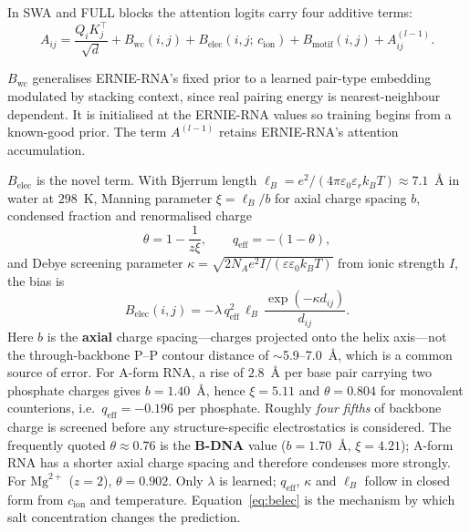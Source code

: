 \documentclass[11pt,a4paper]{article}
\begin{document}
In SWA and FULL blocks the attention logits carry four additive terms:
\begin{equation}
A_{ij} = \frac{Q_i K_j^{\top}}{\sqrt{d}}
       + B_{\mathrm{wc}}(i,j)
       + B_{\mathrm{elec}}(i,j;\,c_{\text{ion}})
       + B_{\mathrm{motif}}(i,j)
       + A^{(l-1)}_{ij}.
\end{equation}

$B_{\mathrm{wc}}$ generalises ERNIE-RNA's fixed prior to a learned pair-type
embedding modulated by stacking context, since real pairing energy is
nearest-neighbour dependent. It is initialised at the ERNIE-RNA values so
training begins from a known-good prior. The term $A^{(l-1)}$ retains
ERNIE-RNA's attention accumulation.

$B_{\mathrm{elec}}$ is the novel term. With Bjerrum length
$\ell_B = e^2/(4\pi\varepsilon_0\varepsilon_r k_B T) \approx 7.1$~\AA{} in water
at $298$~K, Manning parameter $\xi = \ell_B/b$ for axial charge spacing $b$,
condensed fraction and renormalised charge
\begin{equation}
\theta = 1 - \frac{1}{z\xi}, \qquad q_{\text{eff}} = -(1-\theta),
\end{equation}
and Debye screening parameter
$\kappa = \sqrt{2 N_A e^2 I / (\varepsilon\varepsilon_0 k_B T)}$ from ionic
strength $I$, the bias is
\begin{equation}
B_{\mathrm{elec}}(i,j) = -\lambda\, q_{\text{eff}}^{2}\, \ell_B\,
\frac{\exp(-\kappa d_{ij})}{d_{ij}}.
\label{eq:belec}
\end{equation}
Here $b$ is the \textbf{axial} charge spacing---charges projected onto the helix
axis---not the through-backbone P--P contour distance of $\sim$5.9--7.0~\AA{},
which is a common source of error. For A-form RNA, a rise of $2.8$~\AA{} per base
pair carrying two phosphate charges gives $b = 1.40$~\AA{}, hence $\xi = 5.11$
and $\theta = 0.804$ for monovalent counterions, i.e.\ $q_{\text{eff}} = -0.196$
per phosphate. Roughly \emph{four fifths} of backbone charge is screened before
any structure-specific electrostatics is considered. The frequently quoted
$\theta \approx 0.76$ is the \textbf{B-DNA} value ($b = 1.70$~\AA{},
$\xi = 4.21$); A-form RNA has a shorter axial charge spacing and therefore
condenses more strongly. For $\mathrm{Mg}^{2+}$ ($z=2$), $\theta = 0.902$.
Only $\lambda$ is learned; $q_{\text{eff}}$, $\kappa$ and $\ell_B$ follow in
closed form from $c_{\text{ion}}$ and temperature. Equation~\eqref{eq:belec} is
the mechanism by which salt concentration changes the prediction.
\end{document}
